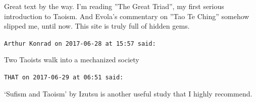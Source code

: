 \begin{footnotesize}
\begin{sffamily}
Great text by the way. I'm reading ''The Great Triad'', my first serious introduction to Taoism. And Evola's commentary on ''Tao Te Ching'' somehow slipped me, until now. This site is truly full of hidden gems.

\hfill

\texttt{Arthur Konrad on 2017-06-28 at 15:57 said:}

Two Taoists walk into a mechanized society

\hfill

\texttt{THAT on 2017-06-29 at 06:51 said:}

`Sufism and Taoism' by Izutsu is another useful study that I highly recommend.

\hfill

\end{sffamily}
\end{footnotesize}

